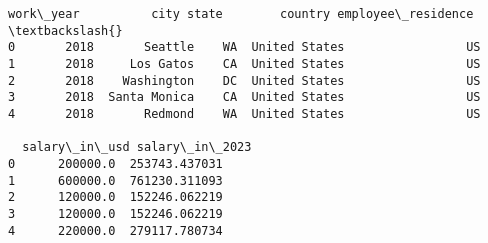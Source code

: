 \documentclass[11pt]{article}
\begin{document}
    \begin{Verbatim}[commandchars=\\\{\}]
   work\_year          city state        country employee\_residence  \textbackslash{}
0       2018       Seattle    WA  United States                 US
1       2018     Los Gatos    CA  United States                 US
2       2018    Washington    DC  United States                 US
3       2018  Santa Monica    CA  United States                 US
4       2018       Redmond    WA  United States                 US

  salary\_in\_usd salary\_in\_2023
0      200000.0  253743.437031
1      600000.0  761230.311093
2      120000.0  152246.062219
3      120000.0  152246.062219
4      220000.0  279117.780734
    \end{Verbatim}
\end{document}
